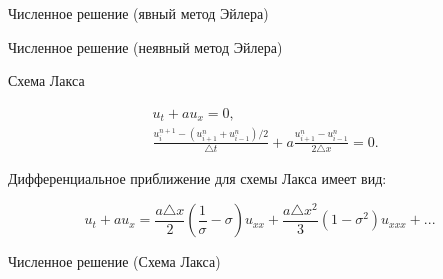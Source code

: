 \documentclass[10pt,xcolor=pst,aspectratio=169]{beamer}
\begin{document}
\begin{frame}{Численное решение (явный метод Эйлера)}

	\transdissolve[duration=0.1]
	\justifying
	\large
	
    \begin{figure}[h]
    \end{figure}

\end{frame}

\begin{frame}{Численное решение (неявный метод Эйлера)}

	\transdissolve[duration=0.1]
	\justifying
	\large

    \begin{figure}[h]
    \end{figure}

\end{frame}

\begin{frame}{Схема Лакса}

	\transdissolve[duration=0.1]
	\justifying
	\large

	\[
		\begin{split}
			&u_{t} + a u_{x} = 0 , \\
			&\frac{u^{n + 1}_{i} - (u^{n}_{i+1} + u^{n}_{i-1}) / 2}{\triangle t} + a \frac{u^{n}_{i + 1} - u^{n}_{i - 1}}{2 \triangle x} = 0 .
		\end{split}
	\]

	Дифференциальное приближение для схемы Лакса имеет вид:

	\[
		u_{t} + a u_{x} = \frac{a \triangle x}{2} \left( \frac{1}{\sigma} - \sigma \right) u_{xx} + \frac{a \triangle x^{2}}{3} (1 - \sigma^{2}) u_{xxx} + ...
	\]

\end{frame}

\begin{frame}{Численное решение (Схема Лакса)}

	\transdissolve[duration=0.1]
	\justifying
	\large

    \begin{figure}[h]
    \end{figure}

\end{frame}
\end{document}
